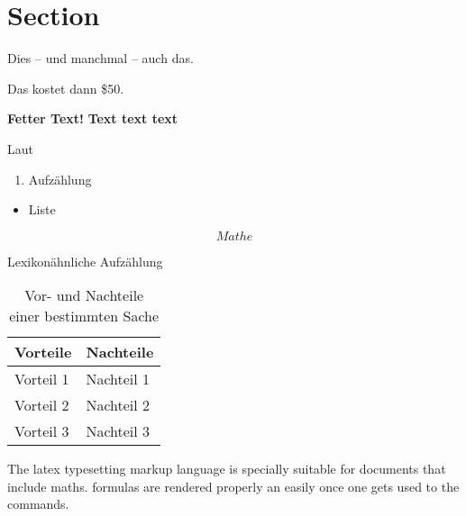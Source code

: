 
\section{Section}


Dies -- und manchmal -- auch das.

Das kostet dann \$50.

\textbf{Fetter Text!}
\bfseries
Text text text
\normalfont %

Laut \cite{nguyen_machine_2018}


\begin{enumerate}
    \item Aufzählung
\end{enumerate}

\begin{itemize}
    \item Liste
\end{itemize}

\begin{equation}
    Mathe
\end{equation}

\begin{description}
    \item[Lexikonähnliche Aufzählung]
\end{description}


\begin{table}[h]
    \centering
    \begin{tabular}{|p{5cm}|p{5cm}|} 
        \hline
        \textbf{Vorteile} & \textbf{Nachteile} \\
        \hline
        Vorteil 1 & Nachteil 1 \\
        Vorteil 2 & Nachteil 2 \\
        Vorteil 3 & Nachteil 3 \\
        \hline
    \end{tabular}
    \caption{Vor- und Nachteile einer bestimmten Sache}
    \label{tab:beispiel}
\end{table}


The \Gls{latex} typesetting markup language is specially suitable 
for documents that include \gls{maths}. \Glspl{formula} are 
rendered properly an easily once one gets used to the commands.

